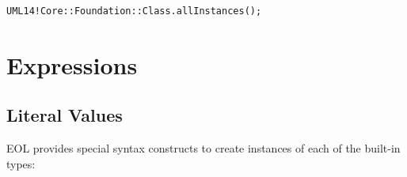 \begin{lstlisting}[float=h, caption=Demonstration of the concrete syntax for accessing model element types, label=lst:ModelElementTypes, language=EOL]
UML14!Core::Foundation::Class.allInstances();
\end{lstlisting}

\section{Expressions}

\subsection{Literal Values}

EOL provides special syntax constructs to create instances of each of the built-in types:

